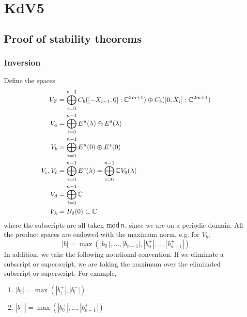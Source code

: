 \documentclass[thesis.tex]{subfiles}
\begin{document}
\iffulldocument\else
	\chapter{KdV5}
\fi

\section{Proof of stability theorems} 











\subsection{Inversion}

Define the spaces
\begin{align*}
V_Z &= \bigoplus_{i=0}^{n-1} C_b([-X_{i-1},0]:\mathbb{C}^{2m+1}) \oplus C_b([0,X_i]:\mathbb{C}^{2m+1})  \\
V_a &= \bigoplus_{i=0}^{n-1} E^u(\lambda) \oplus E^s(\lambda) \\
V_b &= \bigoplus_{i=0}^{n-1} E^u(0) \oplus E^s(0) \\
V_c, V_{\tilde{c}} &= \bigoplus_{i=0}^{n-1} E^c(\lambda) = \bigoplus_{i=0}^{n-1} \mathbb{C} V_0(\lambda) \\
V_d &= \bigoplus_{i=0}^{n-1} \mathbb{C} \\
V_\lambda &= B_\delta(0) \subset \mathbb{C}
\end{align*}
where the subscripts are all taken $\mathop\mathrm{mod}\nolimits n$, since we are on a periodic domain. All the product spaces are endowed with the maximum norm, e.g. for $V_b$, 
\[
|b| = \max(|b_0^-|, \dots, |b_{n-1}^-|, |b_0^+|, \dots, |b_{n-1}^+|)
\]
In addition, we take the following notational convention. If we eliminate a subscript or superscript, we are taking the maximum over the eliminated subscript or superscript. For example,
\begin{enumerate}
	\item $|b_i| = \max(|b_i^+|, |b_i^-|)$ 
	\item $|b^+| = \max(|b_0^+|, \dots, |b_{n-1}^+|)$
\end{enumerate}
\end{document}
